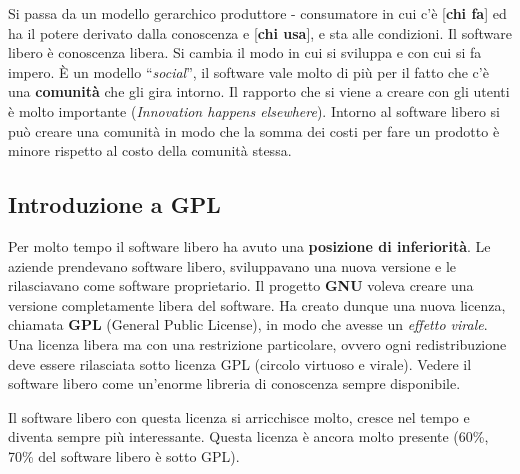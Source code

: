 Si passa da un modello gerarchico produttore - consumatore in cui c'è [\textbf{chi fa}] ed ha il potere derivato dalla conoscenza e [\textbf{chi usa}], e sta alle condizioni. Il software libero è conoscenza libera. Si cambia il modo in cui si sviluppa e con cui si fa impero. È un modello ``\textit{social}'', il software vale molto di più per il fatto che c'è una \textbf{comunità} che gli gira intorno. Il rapporto che si viene a creare con gli utenti è molto importante (\textit{Innovation happens elsewhere}). Intorno al software libero si può creare una comunità in modo che la somma dei costi per fare un prodotto è minore rispetto al costo della comunità stessa.

\subsection{Introduzione a GPL}

Per molto tempo il software libero ha avuto una \textbf{posizione di inferiorità}. Le aziende prendevano software libero, sviluppavano una nuova versione e le rilasciavano come software proprietario. Il progetto \textbf{GNU} voleva creare una versione completamente libera del software. Ha creato dunque una nuova licenza, chiamata \textbf{GPL} (General Public License), in modo che avesse un \textit{effetto virale}. Una licenza libera ma con una restrizione particolare, ovvero ogni redistribuzione deve essere rilasciata sotto licenza GPL (circolo virtuoso e virale). Vedere il software libero come un'enorme libreria di conoscenza sempre disponibile.

Il software libero con questa licenza si arricchisce molto, cresce nel tempo e diventa sempre più interessante. Questa licenza è ancora molto presente (60\%, 70\% del software libero è sotto GPL).